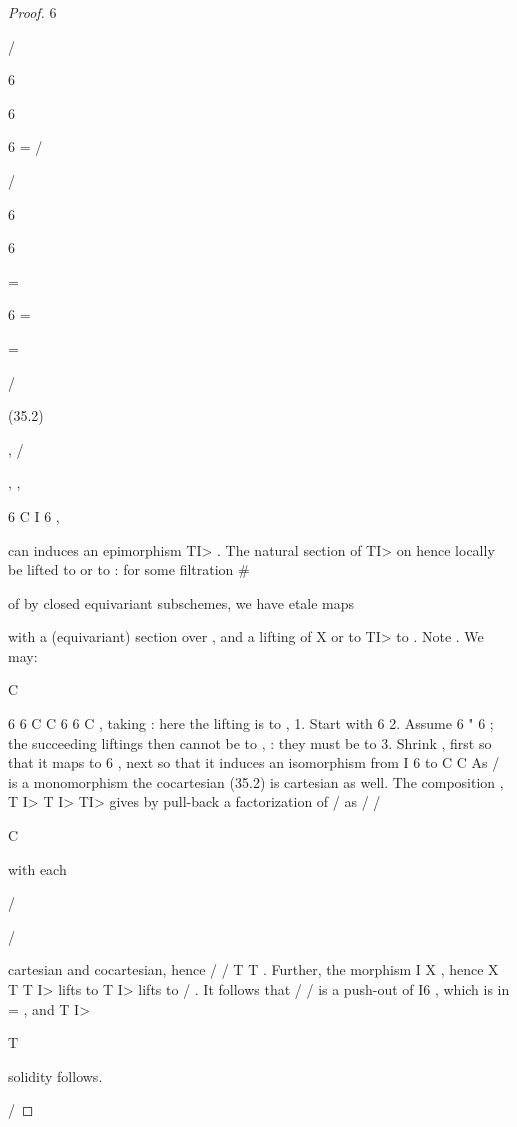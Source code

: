 \documentclass[11pt,a4paper]{article}
\theoremstyle{plain}
\theoremstyle{definition}
\begin{document}
\begin{proof}
6

/


6



6

6 =
 /

/

6









6

=



6 =

 =


/ 








(35.2)

,  /

,
,

6
C
I  6
,

can
induces an epimorphism
TI> . The natural section of TI> on
hence locally be lifted to
or to : for some filtration \#
   
 
of by closed equivariant subschemes, we have etale maps 

with a (equivariant) section over     , and a lifting of X
or to
TI> to
. Note 
   . We may:

C

6 6
C C
6 6 C
 , taking   : here the lifting is to ,
1. Start with 6
2. Assume 6 " 6  ; the succeeding liftings then cannot be to , : they must
be to
3. Shrink  , first so that it maps to 6 , next so that it induces an isomorphism from
  I 6  to C  C 
As /
is a monomorphism the cocartesian (35.2) is cartesian as well. The
composition
, T I> T I>
TI>
gives by pull-back a factorization of /
as
/ /

C



with each

/ 




/ 





cartesian and cocartesian, hence /  /  T   T . Further, the morphism
I  X 
, hence X 
T
T I> lifts to
T  I> lifts to /  .
It follows that /
/  is a push-out of I6   , which is in = , and
T I>



T 















solidity follows.

/

\end{proof}
\end{document}
